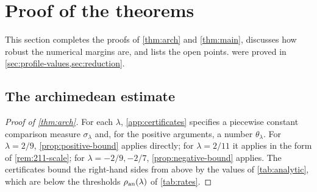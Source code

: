 \section{Proof of the theorems}\label{sec:proof}

This section completes the proofs of \cref{thm:arch} and \cref{thm:main}, discusses how robust the numerical margins are, and lists the open points.  were proved in \cref{sec:profile-values,sec:reduction}.

\subsection{The archimedean estimate}\label{sec:proof-arch}
\begin{proof}[Proof of \cref{thm:arch}]
For each $\lambda$, \cref{app:certificates} specifies a piecewise constant comparison measure $\sigma_\lambda$ and, for the positive arguments, a number $\theta_\lambda$. For $\lambda=2/9$, \cref{prop:positive-bound} applies directly; for $\lambda=2/11$ it applies in the form of \cref{rem:211-scale}; for $\lambda=-2/9,-2/7$, \cref{prop:negative-bound} applies. The certificates bound the right-hand sides from above by the values of \cref{tab:analytic}, which are below the thresholds $\rho_{\mathrm{an}}(\lambda)$ of \cref{tab:rates}.
\end{proof}

